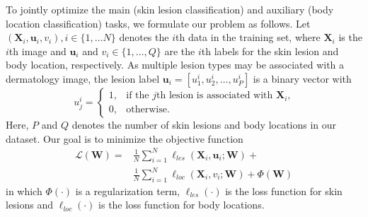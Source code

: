 \documentclass[letterpaper]{article}
\begin{document}
To jointly optimize the main (skin lesion classification) and auxiliary (body
location classification) tasks, we formulate our problem as follows. Let
$(\mathbf{X}_i, \mathbf{u}_i, v_i), i \in \{1, \dots N\}$ denotes the $i$th
data in the training set, where $\mathbf{X}_i$ is
the $i$th image and $\mathbf{u}_i$ and $v_i \in \{1, \dots, Q\}$ are the $i$th
labels for the skin lesion and body location, respectively. As multiple lesion
types may be associated with a dermatology image, the lesion label
$\mathbf{u}_i = [u_1^i, u_2^i, \dots, u_P^i]$ is a binary vector with
\begin{equation}
  u_j^i = \begin{cases}
    1, & \text{if the $j$th lesion is associated with $\mathbf{X}_i$,} \\
    0, & \text{otherwise.}
  \end{cases}
\end{equation}
Here, $P$ and $Q$ denotes the number of skin lesions and body locations in our
dataset. Our goal is to minimize the objective function
\begin{align}
\mathcal{L} (\mathbf{W}) =
& \frac{1}{N}\sum_{i=1}^N\ell_{les}(\mathbf{X}_i, \mathbf{u}_i; \mathbf{W}) + \nonumber \\
& \frac{1}{N}\sum_{i=1}^N\ell_{loc}(\mathbf{X}_i, v_i; \mathbf{W}) + \Phi(\mathbf{W})
\end{align}
in which $\Phi(\cdot)$ is a regularization term, $\ell_{les}(\cdot)$ is the loss function
for skin lesions and $\ell_{loc}(\cdot)$ is the loss function for body locations.
\end{document}
